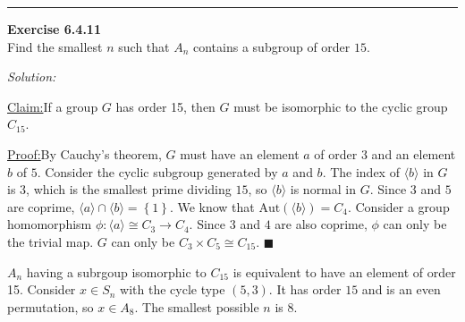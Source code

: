\documentclass[a4paper, 12pt]{article}
\newenvironment{problem}[2][Exercise]
    { \begin{mdframed}[backgroundcolor=gray!20] \textbf{#1 #2} \\}
    {  \end{mdframed}}
\newenvironment{solution}
    {\textit{Solution:}}
    {}
\newenvironment{claim}[1]{\par\noindent\underline{Claim:}\space#1}{}
\newenvironment{claimproof}[1]{\par\noindent\underline{Proof:}\space#1}{\hfill $\blacksquare$}
\newcommand{\la}{\langle}
\newcommand{\ra}{\rangle}
\begin{document}
\noindent\rule{7in}{2.8pt}
\begin{problem}{6.4.11}
Find the smallest \(n\) such that \(A_n\) contains a subgroup of order \(15\).
\end{problem}
\begin{solution}
\begin{claim}
If a group \(G\) has order 15, then \(G\) must be isomorphic to the cyclic group \(C_{15}\).
\end{claim}
\begin{claimproof}
By Cauchy's theorem, \(G\) must have an element \(a\) of order \(3\) and an element \(b\) of \(5\). Consider the cyclic subgroup generated by \(a\) and \(b\). 
The index of \(\la b\ra\) in \(G\) is \(3\), which is the smallest prime dividing \(15\), so \(\la b\ra\) is normal in \(G\). 
Since \(3\) and \(5\) are coprime, 
\(\la a\ra \cap \la b\ra =\left\{ 1 \right\}\). We know that \(\text{Aut}(\la b\ra)=C_4\). Consider a group homomorphism \(\phi:\la a\ra\cong C_3 \rightarrow C_4\). Since \(3\) and \(4\) are also coprime, 
\(\phi\) can only be the trivial map. \(G\) can only be \(C_3\times C_5\cong C_{15}\).
\end{claimproof}

\(A_n\) having a subrgoup isomorphic to \(C_{15}\) is equivalent to have an element of order 15. Consider \(x\in S_n\) with the cycle type \((5,3)\). It has order \(15\) and is an even permutation, so \(x\in A_8\). The smallest 
possible \(n\) is 8.
\end{solution}
\end{document}

